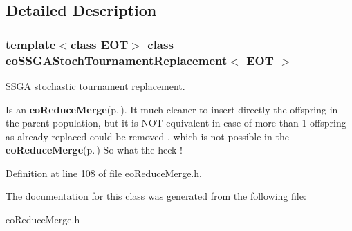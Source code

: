 \subsection{Detailed Description}
\subsubsection*{template$<$class EOT$>$ class eo\-SSGAStoch\-Tournament\-Replacement$<$ EOT $>$}

SSGA stochastic tournament replacement. 

Is an {\bf eo\-Reduce\-Merge}{\rm (p.\,\pageref{classeo_reduce_merge})}. It much cleaner to insert directly the offspring in the parent population, but it is NOT equivalent in case of more than 1 offspring as already replaced could be removed , which is not possible in the {\bf eo\-Reduce\-Merge}{\rm (p.\,\pageref{classeo_reduce_merge})} So what the heck ! 



Definition at line 108 of file eo\-Reduce\-Merge.h.

The documentation for this class was generated from the following file:\begin{CompactItemize}
\item 
eo\-Reduce\-Merge.h\end{CompactItemize}
